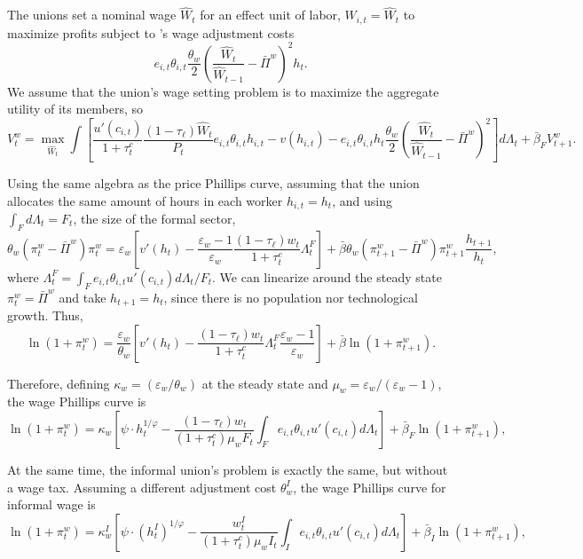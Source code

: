 \documentclass[12pt]{article}
\begin{document}
The unions set a nominal wage $\hat W_t$ for an effect unit of labor,
$W_{i,t} = \hat W_t$ to maximize profits subject to
\textcite{rotemberg1982monopolistic}'s wage adjustment costs
\[
e_{i,t} \theta_{i,t} \frac{\theta_w}{2}
\left( \frac{\hat W_{t}}{\hat W_{t-1}} - \bar \Pi^w \right)^2 h_t.
\]
We assume that the union's wage setting problem is to maximize the aggregate utility of
its members, so
\[
V_t^w = \max_{\hat W_t} \int \left[
\frac{u'(c_{i,t})}{1+\tau^c_t} \frac{(1-\tau_\ell)\hat W_t}{P_t} e_{i,t} \theta_{i,t} h_{i,t}
- v(h_{i,t}) - e_{i,t} \theta_{i,t} h_t \frac{\theta_w}{2}
\left( \frac{\hat W_t}{\hat W_{t-1}} - \bar \Pi^w \right)^2
\right] d\Lambda_t + \bar \beta_F V_{t+1}^w.
\]

Using the same algebra as the price Phillips curve, assuming that the union allocates
the same amount of hours in each worker $h_{i,t} = h_t$, and using
$\int_F d\Lambda_t = F_t$, the size of the formal sector,
\[
\theta_w (\pi_t^w - \bar \Pi^w) \pi_t^w
= \varepsilon_w \left[ v'(h_t)
- \frac{\varepsilon_w-1}{\varepsilon_w} \frac{(1-\tau_\ell) w_t}{1+\tau^c_t} \Lambda_t^F \right]
+ \bar \beta \theta_w (\pi_{t+1}^w - \bar \Pi^w) \pi_{t+1}^w \frac{h_{t+1}}{h_t},
\]
where $\Lambda_t^F = \int_F e_{i,t} \theta_{i,t} u'(c_{i,t}) d\Lambda_t / F_t$. We can
linearize around the steady state $\pi_t^w = \bar \Pi^w$ and take $h_{t+1} = h_t$, since
there is no population nor technological growth. Thus,
\[
\ln (1+\pi_t^w)
= \frac{\varepsilon_w}{\theta_w}
\left[ v'(h_t) - \frac{(1-\tau_\ell) w_t}{1+\tau^c_t} \Lambda_t^F
\frac{\varepsilon_w-1}{\varepsilon_w} \right] + \bar \beta \ln (1+\pi_{t+1}^w).
\]

Therefore, defining $\kappa_w = (\varepsilon_w/\theta_w)$ at the steady state and
$\mu_w = \varepsilon_w/(\varepsilon_w-1)$, the wage Phillips curve is
\[
\ln (1+\pi_t^w)
= \kappa_w \left[ \psi \cdot h_t^{1/\varphi}
- \frac{(1-\tau_\ell) w_t}{(1+\tau^c_t)\mu_w F_t}
    \int_F e_{i,t} \theta_{i,t} u'(c_{i,t}) d\Lambda_t \right]
+ \bar \beta_F \ln (1+\pi_{t+1}^w),
\]

At the same time, the informal union's problem is exactly the same, but without a wage
tax. Assuming a different adjustment cost $\theta_w^I$, the wage Phillips curve for
informal wage is
\[
\ln (1+\pi_t^w)
= \kappa_w^I \left[ \psi \cdot \left( h_t^I \right)^{1/\varphi}
- \frac{w_t^I}{(1+\tau^c_t) \mu_w I_t}
    \int_I e_{i,t} \theta_{i,t} u'(c_{i,t}) d\Lambda_t \right]
+ \bar \beta_I \ln (1+\pi_{t+1}^w),
\]


\end{document}
